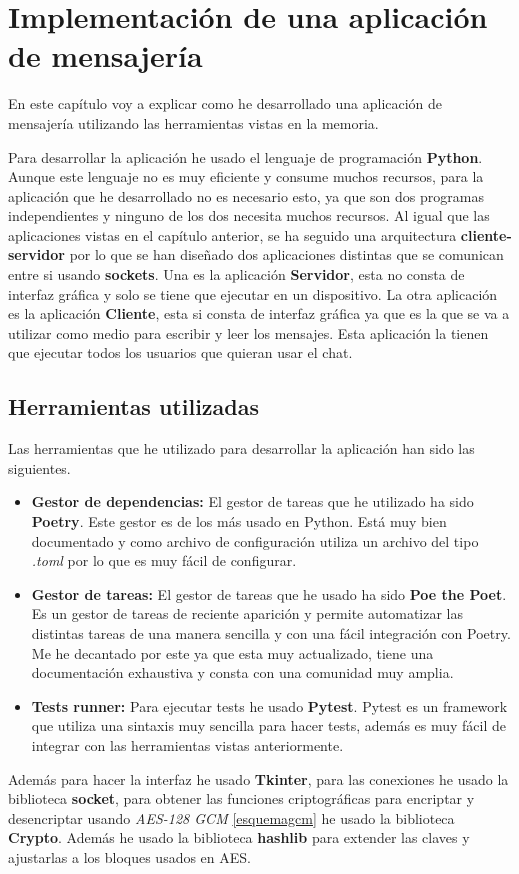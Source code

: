 \chapter{Implementación de una aplicación de mensajería}
\label{chap:ocho}

En este capítulo voy a explicar como he desarrollado una aplicación de mensajería utilizando las herramientas vistas en la memoria.

Para desarrollar la aplicación he usado el lenguaje de programación \textbf{Python}. Aunque este lenguaje no es muy eficiente y consume muchos recursos, para la aplicación que he desarrollado no es necesario esto, ya que son dos programas independientes y ninguno de los dos necesita muchos recursos. Al igual que las aplicaciones vistas en el capítulo anterior, se ha seguido una arquitectura \textbf{cliente-servidor} por lo que se han diseñado dos aplicaciones distintas que se comunican entre si usando \textbf{sockets}. Una es la aplicación \textbf{Servidor}, esta no consta de interfaz gráfica y solo se tiene que ejecutar en un dispositivo. La otra aplicación es la aplicación \textbf{Cliente}, esta si consta de interfaz gráfica ya que es la que se va a utilizar como medio para escribir y leer los mensajes. Esta aplicación la tienen que ejecutar todos los usuarios que quieran usar el chat.

\section{Herramientas utilizadas}
Las herramientas que he utilizado para desarrollar la aplicación han sido las siguientes.
\begin{itemize}
	\item \textbf{Gestor de dependencias:} El gestor de tareas que he utilizado ha sido \textbf{Poetry}. Este gestor es de los más usado en Python. Está muy bien documentado y como archivo de configuración utiliza un archivo del tipo \emph{.toml} por lo que es muy fácil de configurar. 
	\item \textbf{Gestor de tareas:} El gestor de tareas que he usado ha sido \textbf{Poe the Poet}. Es un gestor de tareas de reciente aparición y permite automatizar las distintas tareas de una manera sencilla y con una fácil integración con Poetry. Me he decantado por este ya que esta muy actualizado, tiene una documentación exhaustiva y consta con una comunidad muy amplia.
	\item \textbf{Tests runner:} Para ejecutar tests he usado \textbf{Pytest}. Pytest es un framework que utiliza una sintaxis muy sencilla para hacer tests, además es muy fácil de integrar con las herramientas vistas anteriormente.
\end{itemize}
Además para hacer la interfaz he usado \textbf{Tkinter}, para las conexiones he usado la biblioteca \textbf{socket}, para obtener las funciones criptográficas para encriptar y desencriptar usando \emph{AES-128 GCM} \ref{esquemagcm} he usado la biblioteca \textbf{Crypto}. Además he usado la biblioteca \textbf{hashlib} para extender las claves y ajustarlas a los bloques usados en AES.


